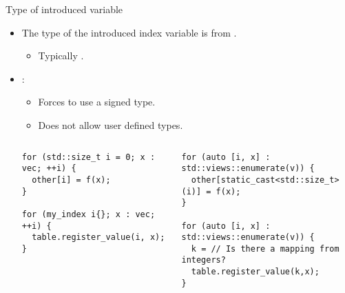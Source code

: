 \begin{frame}[t,fragile]{Type of introduced variable}
\begin{itemize}
  \item The type of the introduced index variable is from
     .
    \begin{itemize}
      \item Typically .
    \end{itemize}

  \vfill\pause
  \item {}:
    \begin{itemize}
      \item Forces to use a signed type.
      \item Does not allow user defined types.
    \end{itemize}

\begin{columns}[T]

\begin{lstlisting}
for (std::size_t i = 0; x : vec; ++i) {
  other[i] = f(x);
}

for (my_index i{}; x : vec; ++i) {
  table.register_value(i, x);
}
\end{lstlisting}

\pause
{}
\begin{lstlisting}
for (auto [i, x] : std::views::enumerate(v)) {
  other[static_cast<std::size_t>(i)] = f(x);
}

for (auto [i, x] : std::views::enumerate(v)) {
  k = // Is there a mapping from integers?
  table.register_value(k,x);
}
\end{lstlisting}

\end{columns}

\end{itemize}
\end{frame}

